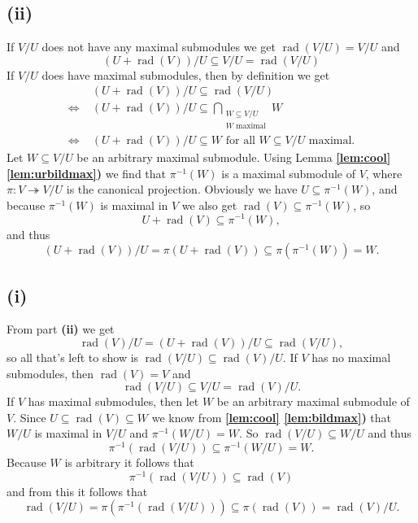 \documentclass[a4paper,10pt]{article}
\theoremstyle{definition}
\newcommand{\rad}{\operatorname{rad}}
\begin{document}
\subsection*{(ii)}
If $V\!/U$ does not have any maximal submodules we get $\rad(V\!/U) = V\!/U$ and
\[
 (U+\rad(V))/U \subseteq V\!/U = \rad(V\!/U)
\]
If $V\!/U$ does have maximal submodules, then by definition we get
\begin{align*}
 &\; (U + \rad(V))/U \subseteq \rad(V\!/U) \\
 \Leftrightarrow&\; (U + \rad(V))/U \subseteq \bigcap_{\substack{W \subseteq V\!/U \\ W \text{ maximal}}} W \\
 \Leftrightarrow&\; (U + \rad(V))/U \subseteq W \text{ for all } W \subseteq V\!/U \text{ maximal}.
\end{align*}
Let $W \subseteq V\!/U$ be an arbitrary maximal submodule. Using Lemma \textbf{\ref{lem:cool} \ref{lem:urbildmax})} we find that $\pi^{-1}(W)$ is a maximal submodule of $V$, where $\pi : V \twoheadrightarrow V/U$ is the canonical projection. Obviously we have $U \subseteq \pi^{-1}(W)$, and because $\pi^{-1}(W)$ is maximal in $V$ we also get $\rad(V) \subseteq \pi^{-1}(W)$, so
\[
 U+\rad(V) \subseteq \pi^{-1}(W),
\]
and thus
\[
 (U+\rad(V))/U = \pi(U+\rad(V)) \subseteq \pi(\pi^{-1}(W)) = W.
\]


\subsection*{(i)}
From part \textbf{(ii)} we get
\[
 \rad(V)/U = (U+\rad(V))/U \subseteq \rad(V\!/U),
\]
so all that’s left to show is $\rad(V\!/U) \subseteq \rad(V)/U$. If $V$ has no maximal submodules, then $\rad(V) = V$ and
\[
 \rad(V\!/U) \subseteq V\!/U = \rad(V)/U.
\]
If $V$ has maximal submodules, then let $W$ be an arbitrary maximal submodule of $V$. Since $U \subseteq \rad(V) \subseteq W$ we know from \textbf{\ref{lem:cool} \ref{lem:bildmax})} that $W\!/U$ is maximal in $V\!/U$ and $\pi^{-1}(W\!/U) = W$. So $\rad(V\!/U) \subseteq W\!/U$ and thus
\[
 \pi^{-1}(\rad(V\!/U)) \subseteq \pi^{-1}(W\!/U) = W.
\]
Because $W$ is arbitrary it follows that
\[
 \pi^{-1}(\rad(V\!/U)) \subseteq \rad(V)
\]
and from this it follows that
\[
 \rad(V\!/U) = \pi(\pi^{-1}(\rad(V\!/U))) \subseteq \pi(\rad(V)) = \rad(V)/U.
\]





\section{}
\end{document}
